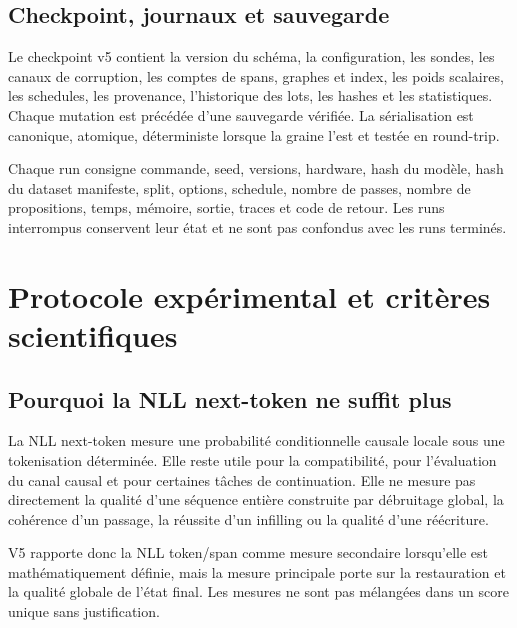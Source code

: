 \documentclass[11pt,a4paper,oneside]{report}
\begin{document}
\chapter{Checkpoint, journaux et sauvegarde}
Le checkpoint v5 contient la version du schéma, la configuration, les sondes, les canaux de corruption, les comptes de spans, graphes et index, les poids scalaires, les schedules, les provenance, l'historique des lots, les hashes et les statistiques. Chaque mutation est précédée d'une sauvegarde vérifiée. La sérialisation est canonique, atomique, déterministe lorsque la graine l'est et testée en round-trip.

Chaque run consigne commande, seed, versions, hardware, hash du modèle, hash du dataset manifeste, split, options, schedule, nombre de passes, nombre de propositions, temps, mémoire, sortie, traces et code de retour. Les runs interrompus conservent leur état et ne sont pas confondus avec les runs terminés.

\part{Protocole expérimental et critères scientifiques}
\chapter{Pourquoi la NLL next-token ne suffit plus}
La NLL next-token mesure une probabilité conditionnelle causale locale sous une tokenisation déterminée. Elle reste utile pour la compatibilité, pour l'évaluation du canal causal et pour certaines tâches de continuation. Elle ne mesure pas directement la qualité d'une séquence entière construite par débruitage global, la cohérence d'un passage, la réussite d'un infilling ou la qualité d'une réécriture.

V5 rapporte donc la NLL token/span comme mesure secondaire lorsqu'elle est mathématiquement définie, mais la mesure principale porte sur la restauration et la qualité globale de l'état final. Les mesures ne sont pas mélangées dans un score unique sans justification.
\end{document}
